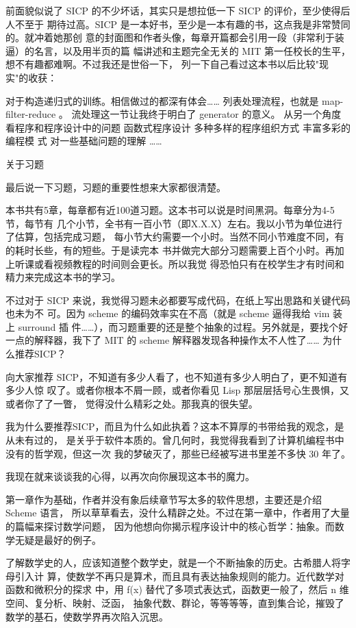 \documentclass[11pt]{article}
\begin{document}
前面貌似说了 SICP 的不少坏话，其实只是想拉低一下 SICP 的评价，至少使得后人不至于
期待过高。SICP 是一本好书，至少是一本有趣的书，这点我是非常赞同的。就冲着她那创
意的封面图和作者头像，每章开篇都会引用一段（非常利于装逼）的名言，以及用半页的篇
幅讲述和主题完全无关的 MIT 第一任校长的生平，想不有趣都难啊。不过我还是世俗一下，
列一下自己看过这本书以后比较"现实"的收获：

对于构造递归式的训练。相信做过的都深有体会…… 列表处理流程，也就是
map-filter-reduce 。 流处理这一节让我终于明白了 generator 的意义。 从另一个角度
看程序和程序设计中的问题 函数式程序设计 多种多样的程序组织方式 丰富多彩的编程模
式 对一些基础问题的理解 ……

关于习题

最后说一下习题，习题的重要性想来大家都很清楚。

本书共有5章，每章都有近100道习题。这本书可以说是时间黑洞。每章分为4-5节，每节有
几个小节，全书有一百小节（即X.X.X）左右。我以小节为单位进行了估算，包括完成习题，
每小节大约需要一个小时。当然不同小节难度不同，有的耗时长些，有的短些。于是读完本
书并做完大部分习题需要上百个小时。再加上听课或看视频教程的时间则会更长。所以我觉
得恐怕只有在校学生才有时间和精力来完成这本书的学习。

不过对于 SICP 来说，我觉得习题未必都要写成代码，在纸上写出思路和关键代码也未为不
可。因为 scheme 的编码效率实在不高（就是 scheme 逼得我给 vim 装上 surround 插
件……），而习题重要的还是整个抽象的过程。另外就是，要找个好一点的解释器，我下了
MIT 的 scheme 解释器发现各种操作太不人性了…… 为什么推荐SICP？

向大家推荐 SICP，不知道有多少人看了，也不知道有多少人明白了，更不知道有多少人惊
叹了。或者你根本不屑一顾，或者你看见 Lisp 那层层括号心生畏惧，又或者你了了一瞥，
觉得没什么精彩之处。那我真的很失望。

我为什么要推荐SICP，而且为什么如此执着？这本不算厚的书带给我的观念，是从未有过的，
是关乎于软件本质的。曾几何时，我觉得我看到了计算机编程书中没有的哲学观，但这一次
我的梦破灭了，那些已经被写进书里差不多快 30 年了。

我现在就来谈谈我的心得，以再次向你展现这本书的魔力。

第一章作为基础，作者并没有象后续章节写太多的软件思想，主要还是介绍 Scheme 语言，
所以草草看去，没什么精辟之处。不过在第一章中，作者用了大量的篇幅来探讨数学问题，
因为他想向你揭示程序设计中的核心哲学：抽象。而数学无疑是最好的例子。

了解数学史的人，应该知道整个数学史，就是一个不断抽象的历史。古希腊人将字母引入计
算，使数学不再只是算术，而且具有表达抽象规则的能力。近代数学对函数和微积分的探求
中，用 f(x) 替代了多项式表达式，函数更一般了，然后 n 维空间、复分析、映射、泛函，
抽象代数、群论，等等等等，直到集合论，摧毁了数学的基石，使数学界再次陷入沉思。
\end{document}
